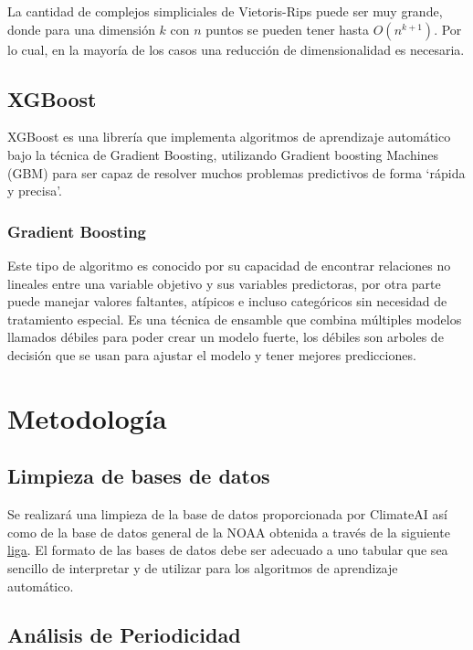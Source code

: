 \documentclass{article}
\begin{document}
            La cantidad de complejos simpliciales de Vietoris-Rips puede ser muy grande, donde para una dimensión $k$ con $n$ puntos se pueden tener hasta $O(n^{k+1})$. Por lo cual, en la mayoría de los casos una reducción de dimensionalidad es necesaria.\cite{Yujie}

        \subsection{XGBoost}

            XGBoost es una librería que implementa algoritmos de aprendizaje automático bajo la técnica de Gradient Boosting, utilizando Gradient boosting Machines (GBM) para ser capaz de resolver muchos problemas predictivos de forma `rápida y precisa'.\cite{XGBoost}

            \subsubsection{Gradient Boosting}

                Este tipo de algoritmo es conocido por su capacidad de encontrar relaciones no lineales entre una variable objetivo y sus variables predictoras, por otra parte puede manejar valores faltantes, atípicos e incluso categóricos sin necesidad de tratamiento especial. Es una técnica de ensamble que combina múltiples modelos llamados débiles para poder crear un modelo fuerte, los débiles son arboles de decisión que se usan para ajustar el modelo y tener mejores predicciones.\cite{GradBoost}

    \section{Metodología} \label{sec:method}

        \subsection{Limpieza de bases de datos}

            Se realizará una limpieza de la base de datos proporcionada por ClimateAI así como de la base de datos general de la NOAA obtenida a través de la siguiente \href{https://www.cpc.ncep.noaa.gov/data/indices/sstoi.indices}{liga}. El formato de las bases de datos debe ser adecuado a uno tabular que sea sencillo de interpretar y de utilizar para los algoritmos de aprendizaje automático.

        \subsection{Análisis de Periodicidad}
\end{document}

